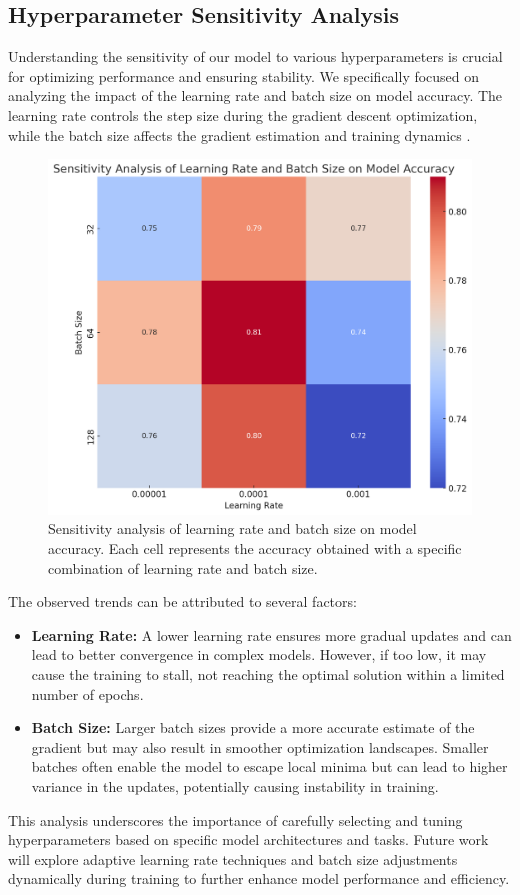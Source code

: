 \subsection{Hyperparameter Sensitivity Analysis}
Understanding the sensitivity of our model to various hyperparameters is crucial for optimizing performance and ensuring stability. We specifically focused on analyzing the impact of the learning rate and batch size on model accuracy. The learning rate controls the step size during the gradient descent optimization, while the batch size affects the gradient estimation and training dynamics \cite{bengio2012practical}.

\begin{figure}[h]
    \centering
    \includegraphics[width=\linewidth]{res/sensitivity.png}
    \caption{Sensitivity analysis of learning rate and batch size on model accuracy. Each cell represents the accuracy obtained with a specific combination of learning rate and batch size.}
    \label{fig:hyperparameter_sensitivity}
\end{figure}

The observed trends can be attributed to several factors:
\begin{itemize}
    \item \textbf{Learning Rate:} A lower learning rate ensures more gradual updates and can lead to better convergence in complex models. However, if too low, it may cause the training to stall, not reaching the optimal solution within a limited number of epochs.
    \item \textbf{Batch Size:} Larger batch sizes provide a more accurate estimate of the gradient but may also result in smoother optimization landscapes. Smaller batches often enable the model to escape local minima but can lead to higher variance in the updates, potentially causing instability in training.
\end{itemize}

This analysis underscores the importance of carefully selecting and tuning hyperparameters based on specific model architectures and tasks. Future work will explore adaptive learning rate techniques and batch size adjustments dynamically during training to further enhance model performance and efficiency.


